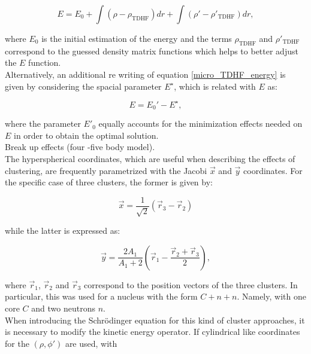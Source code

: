 \documentclass[openany]{book}
\begin{document}
\begin{equation}\label{micro_TDHF_energy}
	E = E_0 + \int (\rho - \rho_{\mathrm{TDHF}} ) dr +   \int (\rho' - \rho'_{\mathrm{TDHF}} ) dr, 
\end{equation}

where $E_0$ is the initial estimation of the energy and the terms $\rho_{\mathrm{TDHF}}$ and  $\rho'_{\mathrm{TDHF}}$ correspond to the guessed density matrix functions which helps to better adjust the $E$ function.  \\

Alternatively, an additional re writing of equation  \ref{micro_TDHF_energy} is given by considering the spacial parameter $E^{\star}$, which is related with $E$ as: 

\begin{equation}\label{micro_TDHF_energy_reduced}
	E = E_0' - E^{\star},
\end{equation}

where the parameter $E'_0$ equally accounts for the minimization effects needed on $E$ in order to obtain the optimal solution. \\

Break up effects (four -five body model)\cite{shubhchintak_descouvemont_2022}. \\

The hyperspherical coordinates, which are useful when describing the effects of clustering, are frequently parametrized with the Jacobi $\vec x$ and $\vec y$ coordinates. For the specific case of three clusters, the former is given by:

\begin{equation}\label{eq:micro_cluster_breakup_jacobi_x}
	\vec x = \frac{1}{\sqrt{2}} (\vec r_3 - \vec r_2)
\end{equation}

while the latter is expressed as: 

\begin{equation}\label{eq:micro_cluster_breakup_jacobi_y}
	\vec y = \frac{2A_1}{A_1 + 2} \left ( \vec r_1  - \frac{\vec r_2 + \vec r_3}{2} \right),
\end{equation}

where $\vec r_1$, $\vec r_2$ and $\vec r_3$ correspond to the position vectors of the three clusters. In particular, this was used for a nucleus with the form $C + n + n$. Namely, with one core $C$ and two neutrons $n$. \\

When introducing the Schrödinger equation for this kind of cluster approaches, it is necessary to modify the kinetic energy operator. If cylindrical like coordinates for the  $(\rho, \phi')$ are used, with 
\end{document}
